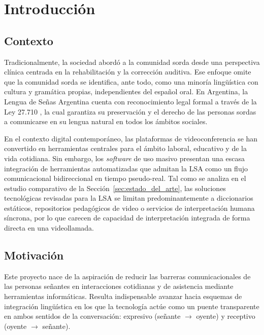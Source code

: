 \chapter{Introducción}

\section{Contexto}
Tradicionalmente, la sociedad abordó a la comunidad sorda desde una perspectiva clínica centrada en la rehabilitación y la corrección auditiva. Ese enfoque omite que la comunidad sorda se identifica, ante todo, como una minoría lingüística con cultura y gramática propias, independientes del español oral. En Argentina, la Lengua de Señas Argentina cuenta con reconocimiento legal formal a través de la Ley 27.710 \parencite{argentina2023ley27710}, la cual garantiza su preservación y el derecho de las personas sordas a comunicarse en su lengua natural en todos los ámbitos sociales.

En el contexto digital contemporáneo, las plataformas de videoconferencia se han convertido en herramientas centrales para el ámbito laboral, educativo y de la vida cotidiana. Sin embargo, los \textit{software} de uso masivo presentan una escasa integración de herramientas automatizadas que admitan la LSA como un flujo comunicacional bidireccional en tiempo pseudo-real. Tal como se analiza en el estudio comparativo de la Sección~\ref{sec:estado_del_arte}, las soluciones tecnológicas revisadas para la LSA se limitan predominantemente a diccionarios estáticos, repositorios pedagógicos de video o servicios de interpretación humana síncrona, por lo que carecen de capacidad de interpretación integrada de forma directa en una videollamada.

\section{Motivación}
Este proyecto nace de la aspiración de reducir las barreras comunicacionales de las personas señantes en interacciones cotidianas y de asistencia mediante herramientas informáticas. Resulta indispensable avanzar hacia esquemas de integración lingüística en los que la tecnología actúe como un puente transparente en ambos sentidos de la conversación: expresivo (señante $\rightarrow$ oyente) y receptivo (oyente $\rightarrow$ señante).

